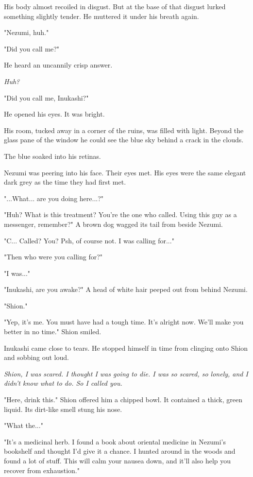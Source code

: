 His body almost recoiled in disgust. But at the base of that disgust
lurked something slightly tender. He muttered it under his breath again.

"Nezumi, huh."

\mybreak

"Did you call me?"

He heard an uncannily crisp answer.

\emph{Huh?}

"Did you call me, Inukashi?"

He opened his eyes. It was bright.

His room, tucked away in a corner of the ruins, was filled with light.
Beyond the glass pane of the window he could see the blue sky behind a
crack in the clouds.

The blue soaked into his retinas.

Nezumi was peering into his face. Their eyes met. His eyes were the same
elegant dark grey as the time they had first met.

"...What... are you doing here...?"

"Huh? What is this treatment? You're the one who called. Using this guy
as a messenger, remember?" A brown dog wagged its tail from beside
Nezumi.

"C... Called? You? Psh, of course not. I was calling for..."

"Then who were you calling for?"

"I was..."

"Inukashi, are you awake?" A head of white hair peeped out from behind
Nezumi.

"Shion."

"Yep, it's me. You must have had a tough time. It's alright now. We'll
make you better in no time." Shion smiled.

Inukashi came close to tears. He stopped himself in time from clinging
onto Shion and sobbing out loud.

\emph{Shion, I was scared. I thought I was going to die. I was so scared, so
lonely, and I didn't know what to do. So I called you.}

"Here, drink this." Shion offered him a chipped bowl. It contained a
thick, green liquid. Its dirt-like smell stung his nose.

"What the..."

"It's a medicinal herb. I found a book about oriental medicine in
Nezumi's bookshelf and thought I'd give it a chance. I hunted around in
the woods and found a lot of stuff. This will calm your nausea down, and
it'll also help you recover from exhaustion."

